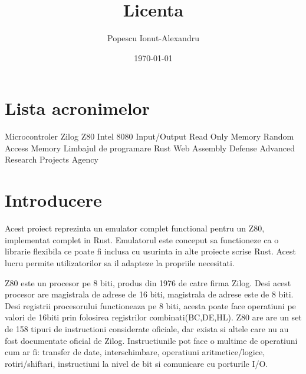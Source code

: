 \documentclass[titlepage,12pt]{article}
\begin{document}
\title{Licenta}
\author{Popescu Ionut-Alexandru}
\date{\today}

\maketitle
\renewcommand{\contentsname}{Cuprins}
\renewcommand{\listfigurename}{Lista figurilor} 
\renewcommand{\listtablename}{Lista tabelelor}
\renewcommand{\figurename}{Figura}
\renewcommand{\tablename}{Tabela}
\tableofcontents
\clearpage  
\listoffigures
\clearpage
\listoftables
\clearpage
\section*{Lista acronimelor} %
\begin{acronym}  
           {Microcontroler Zilog Z80}
         {Intel 8080}
            {Input/Output}
           {Read Only Memory}
           {Random Access Memory}
          {Limbajul de programare Rust}
          {Web Assembly}
         {Defense Advanced Research Projects Agency}
    \end{acronym}
\clearpage

\section{Introducere}
Acest proiect reprezinta un emulator complet functional pentru un \ac {Z80}, implementat complet in \ac {Rust}.
Emulatorul este conceput sa functioneze ca o librarie flexibila ce poate fi inclusa cu usurinta in alte proiecte scrise Rust. Acest lucru permite utilizatorilor sa il adapteze la propriile necesitati.

\ac {Z80} este un procesor pe 8 biti, produs din 1976 de catre firma Zilog. Desi acest procesor are magistrala de adrese de 16 biti, magistrala de adrese este de 8 biti.
Desi registrii procesorului functioneaza pe 8 biti, acesta poate face operatiuni pe valori de 16biti prin folosirea registrilor combinati(BC,DE,HL).
Z80 are are un set de 158 tipuri de instructioni considerate oficiale, dar exista si altele care nu au fost documentate oficial de Zilog. Instructiunile pot face o multime de operatiuni cum ar fi: transfer de date, interschimbare, operatiuni aritmetice/logice, rotiri/shiftari, instructiuni la nivel de bit si comunicare cu porturile I/O.
\end{document}
